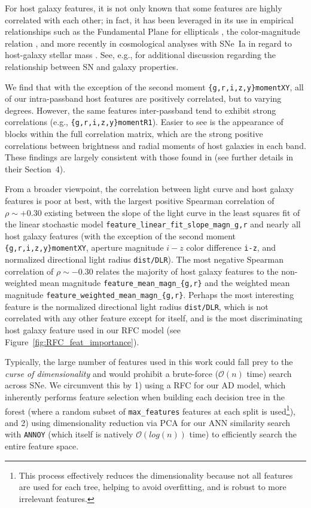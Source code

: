 \documentclass[twocolumn]{aastex63}
\begin{document}
For host galaxy features, it is not only known that some features are highly correlated with each other; in fact, it has been leveraged in its use in empirical relationships such as the Fundamental Plane for ellipticals \citep{Dressler1987}, the color-magnitude relation \citep{Bell2004}, and more recently in cosmological analyses with SNe~Ia in regard to host-galaxy stellar mass \citep{Popovic2021, Kelsey2023}. See, e.g., \cite{Sullivan2010, Kelly2010, BroutScolnic2021, Grayling2024} for additional discussion regarding the relationship between SN and galaxy properties. \par 

We find that with the exception of the second moment \texttt{\{g,r,i,z,y\}momentXY}, all of our intra-passband host features are positively correlated, but to varying degrees. However, the same features inter-passband tend to exhibit strong correlations (e.g., \texttt{\{g,r,i,z,y\}momentR1}). Easier to see is the appearance of blocks within the full correlation matrix, which are the strong positive correlations between brightness and radial moments of host galaxies in each band. These findings are largely consistent with those found in \cite{Gagliano2021} (see further details in their Section~4).

From a broader viewpoint, the correlation between light curve and host galaxy features is poor at best, with the largest positive Spearman correlation of $\rho\sim+0.30$ existing between the slope of the light curve in the least squares fit of the linear stochastic model \texttt{feature\_linear\_fit\_slope\_magn\_{g,r}} and nearly all host galaxy features (with the exception of the second moment \texttt{\{g,r,i,z,y\}momentXY}, aperture magnitude $i-z$ color difference \texttt{i-z}, and normalized directional light radius \texttt{dist/DLR}). The most negative Spearman correlation of $\rho\sim-0.30$ relates the majority of host galaxy features to the non-weighted mean magnitude \texttt{feature\_mean\_magn\_\{g,r\}} and the weighted mean magnitude \texttt{feature\_weighted\_mean\_magn\_\{g,r\}}. Perhaps the most interesting feature is the normalized directional light radius \texttt{dist/DLR}, which is not correlated with any other feature except for itself, and is the most discriminating host galaxy feature used in our RFC model (see Figure~\ref{fig:RFC_feat_importance}).

Typically, the large number of features used in this work could fall prey to the \emph{curse of dimensionality} and would prohibit a brute-force ($\mathcal{O}(n)$ time) search across SNe. We circumvent this by 1) using a RFC for our AD model, which inherently performs feature selection when building each decision tree in the forest (where a random subset of \texttt{max\_features} features at each split is used\footnote{This process effectively reduces the dimensionality because not all features are used for each tree, helping to avoid overfitting, and is robust to more irrelevant features.}), and 2) using dimensionality reduction via PCA for our ANN similarity search with \texttt{ANNOY} (which itself is natively $\mathcal{O}(log(n))$ time) to efficiently search the entire feature space. \par
\end{document}
